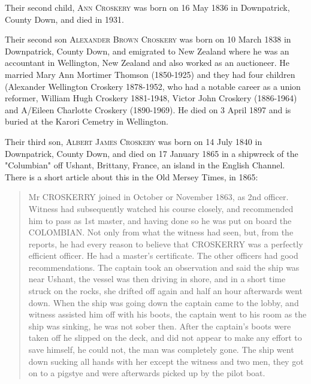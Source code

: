 Their second child, \textsc{Ann Croskery} was born on 16 May 1836 in Downpatrick, County Down, and died in 1931. 

Their second son \textsc{Alexander Brown Croskery} was born on 10 March 1838 in	Downpatrick, County Down, and emigrated to New Zealand where he was an accountant in Wellington, New Zealand and also worked as an auctioneer.  He married Mary Ann Mortimer Thomson (1850-1925) and they had four children (Alexander Wellington Croskery 1878-1952, who had a notable career as a union reformer, William Hugh Croskery 1881-1948, Victor John Croskery (1886-1964) and A/Eileen Charlotte Croskery (1890-1969). He died on 3 April 1897 and is buried at the Karori Cemetry in Wellington.

Their third son, \textsc{Albert James Croskery} was born on	14 July 1840 in	Downpatrick, County Down, and died on 17 January 1865 in a shipwreck of the "Columbian" off Ushant, Brittany, France, an island in the English Channel. There is a short article about this in the Old Mersey Times, in 1865:
\begin{quotation}
Mr CROSKERRY joined in October or November 1863, as 2nd officer. Witness had subsequently watched his course closely, and recommended him to pass as 1st master, and having done so he was put on board the COLOMBIAN. Not only from what the witness had seen, but, from the reports, he had every reason to believe that CROSKERRY was a perfectly efficient officer. He had a master's certificate. The other officers had good recommendations.
The captain took an observation and said the ship was near Ushant, the vessel was then driving in shore, and in a short time struck on the rocks, she drifted off again and half an hour afterwards went down. When the ship was going down the captain came to the lobby, and witness assisted him off with his boots, the captain went to his room as the ship was sinking, he was not sober then. After the captain's boots were taken off he slipped on the deck, and did not appear to make any effort to save himself, he could not, the man was completely gone. The ship went down sucking all hands with her except the witness and two men, they got on to a pigstye and were afterwards picked up by the pilot boat.
\end{quotation}

